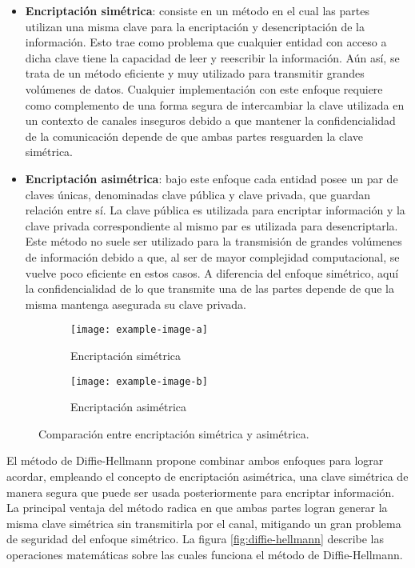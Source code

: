 \begin{itemize}
    \item \textbf{Encriptación simétrica}: consiste en un método en el cual las partes utilizan una misma clave para la encriptación y desencriptación de la información. Esto trae como problema que cualquier entidad con acceso a dicha clave tiene la capacidad de leer y reescribir la información. Aún así, se trata de un método eficiente y muy utilizado para transmitir grandes volúmenes de datos. Cualquier implementación con este enfoque requiere como complemento de una forma segura de intercambiar la clave utilizada en un contexto de canales inseguros debido a que mantener la confidencialidad de la comunicación depende de que ambas partes resguarden la clave simétrica.
    
    \item \textbf{Encriptación asimétrica}: bajo este enfoque cada entidad posee un par de claves únicas, denominadas clave pública y clave privada, que guardan relación entre sí. La clave pública es utilizada para encriptar información y la clave privada correspondiente al mismo par es utilizada para desencriptarla. Este método no suele ser utilizado para la transmisión de grandes volúmenes de información debido a que, al ser de mayor complejidad computacional, se vuelve poco eficiente en estos casos. A diferencia del enfoque simétrico, aquí la confidencialidad de lo que transmite una de las partes depende de que la misma mantenga asegurada su clave privada.
\end{itemize}

\begin{figure}[ht!]
    \centering
    \begin{subfigure}[b]{0.45\textwidth}
        \centering
        \texttt{[image: example-image-a]}
        \caption{Encriptación simétrica}
        \label{fig:simetrica}
    \end{subfigure}
    \hfill
    \begin{subfigure}[b]{0.45\textwidth}
        \centering
        \texttt{[image: example-image-b]}
        \caption{Encriptación asimétrica}
        \label{fig:asimetrica}
    \end{subfigure}
    \caption{Comparación entre encriptación simétrica y asimétrica.}
    \label{fig:encriptacion}
\end{figure}

El método de Diffie-Hellmann propone combinar ambos enfoques para lograr acordar, empleando el concepto de encriptación asimétrica, una clave simétrica de manera segura que puede ser usada posteriormente para encriptar información. La principal ventaja del método radica en que ambas partes logran generar la misma clave simétrica sin transmitirla por el canal, mitigando un gran problema de seguridad del enfoque simétrico. La figura \ref{fig:diffie-hellmann} describe las operaciones matemáticas sobre las cuales funciona el método de Diffie-Hellmann.

